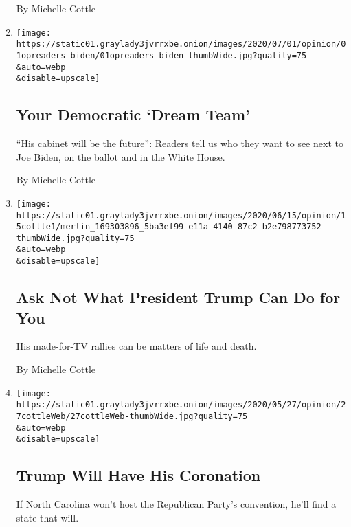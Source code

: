 \begin{enumerate}
  By Michelle Cottle
\item
  \href{/2020/07/01/opinion/biden-running-mate-cabinet.html}{}

  \texttt{[image: https://static01.graylady3jvrrxbe.onion/images/2020/07/01/opinion/01opreaders-biden/01opreaders-biden-thumbWide.jpg?quality=75\\\&auto=webp\\\&disable=upscale]}

  \hypertarget{your-democratic-dream-team}{%
  \subsection{Your Democratic `Dream
  Team'}\label{your-democratic-dream-team}}

  ``His cabinet will be the future'': Readers tell us who they want to
  see next to Joe Biden, on the ballot and in the White House.

  By Michelle Cottle
\item
  \href{/2020/06/15/opinion/trump-rally-coronavirus.html}{}

  \texttt{[image: https://static01.graylady3jvrrxbe.onion/images/2020/06/15/opinion/15cottle1/merlin\_169303896\_5ba3ef99-e11a-4140-87c2-b2e798773752-thumbWide.jpg?quality=75\\\&auto=webp\\\&disable=upscale]}

  \hypertarget{ask-not-what-president-trump-can-do-for-you}{%
  \subsection{Ask Not What President Trump Can Do for
  You}\label{ask-not-what-president-trump-can-do-for-you}}

  His made-for-TV rallies can be matters of life and death.

  By Michelle Cottle
\item
  \href{/2020/05/27/opinion/coronavirus-trump-north-carolina.html}{}

  \texttt{[image: https://static01.graylady3jvrrxbe.onion/images/2020/05/27/opinion/27cottleWeb/27cottleWeb-thumbWide.jpg?quality=75\\\&auto=webp\\\&disable=upscale]}

  \hypertarget{trump-will-have-his-coronation}{%
  \subsection{Trump Will Have His
  Coronation}\label{trump-will-have-his-coronation}}

  If North Carolina won't host the Republican Party's convention, he'll
  find a state that will.


\end{enumerate}
